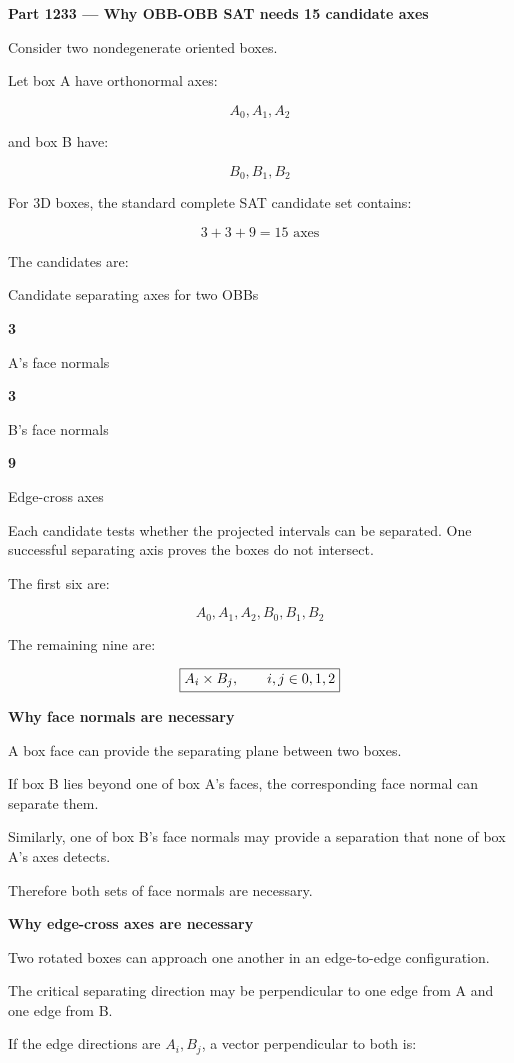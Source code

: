 \textbf{Part 1233 --- Why OBB-OBB SAT needs 15 candidate axes}

Consider two nondegenerate oriented boxes.

Let box A have orthonormal axes:

\[
A_0,A_1,A_2
\]

and box B have:

\[
B_0,B_1,B_2
\]

For 3D boxes, the standard complete SAT candidate set contains:

\[
\boxed{ 3+3+9=15\text{ axes} }
\]

The candidates are:

Candidate separating axes for two OBBs

\textbf{3}

A's face normals

\textbf{3}

B's face normals

\textbf{9}

Edge-cross axes

Each candidate tests whether the projected intervals can be separated. One successful separating axis proves the boxes do not intersect.

The first six are:

\[
A_0,A_1,A_2,B_0,B_1,B_2
\]

The remaining nine are:

\[
\boxed{ A_i\times B_j,\qquad i,j\in\\{0,1,2\\} }
\]

\textbf{Why face normals are necessary}

A box face can provide the separating plane between two boxes.

If box B lies beyond one of box A's faces, the corresponding face normal can separate them.

Similarly, one of box B's face normals may provide a separation that none of box A's axes detects.

Therefore both sets of face normals are necessary.

\textbf{Why edge-cross axes are necessary}

Two rotated boxes can approach one another in an edge-to-edge configuration.

The critical separating direction may be perpendicular to one edge from A and one edge from B.

If the edge directions are \(A_i,B_j\), a vector perpendicular to both is:

